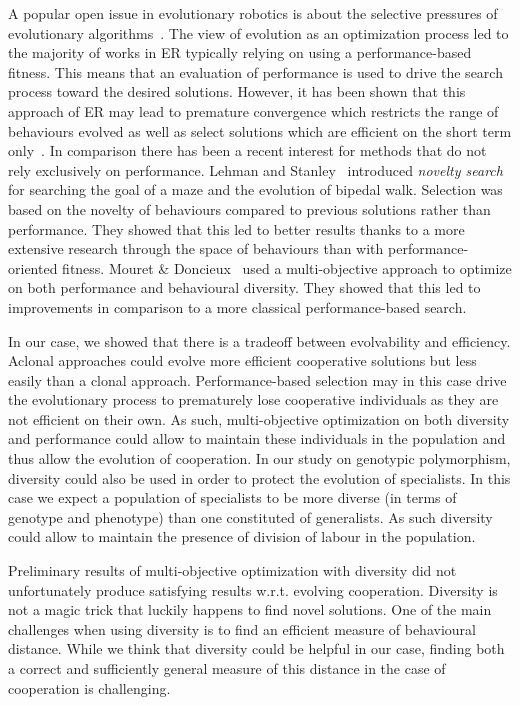 			A popular open issue in evolutionary robotics is about the selective pressures of evolutionary algorithms~\parencite{Doncieux2015a}. The view of evolution as an optimization process led to the majority of works in ER typically relying on using a performance-based fitness. This means that an evaluation of performance is used to drive the search process toward the desired solutions. However, it has been shown that this approach of ER may lead to premature convergence which restricts the range of behaviours evolved as well as select solutions which are efficient on the short term only~\parencite{Mouret2012a}. In comparison there has been a recent interest for methods that do not rely exclusively on performance. Lehman and Stanley~\parencite{Lehman2011} introduced \emph{novelty search} for searching the goal of a maze and the evolution of bipedal walk. Selection was based on the novelty of behaviours compared to previous solutions rather than performance. They showed that this led to better results thanks to a more extensive research through the space of behaviours than with performance-oriented fitness. Mouret \& Doncieux~\parencite{Mouret2012a} used a multi-objective approach to optimize on both performance and behavioural diversity. They showed that this led to improvements in comparison to a more classical performance-based search.

			In our case, we showed that there is a tradeoff between evolvability and efficiency. Aclonal approaches could evolve more efficient cooperative solutions but less easily than a clonal approach. Performance-based selection may in this case drive the evolutionary process to prematurely lose cooperative individuals as they are not efficient on their own. As such, multi-objective optimization on both diversity and performance could allow to maintain these individuals in the population and thus allow the evolution of cooperation. In our study on genotypic polymorphism, diversity could also be used in order to protect the evolution of specialists. In this case we expect a population of specialists to be more diverse (in terms of genotype and phenotype) than one constituted of generalists. As such diversity could allow to maintain the presence of division of labour in the population.

			Preliminary results of multi-objective optimization with diversity did not unfortunately produce satisfying results w.r.t. evolving cooperation. Diversity is not a magic trick that luckily happens to find novel solutions. One of the main challenges when using diversity is to find an efficient measure of behavioural distance. While we think that diversity could be helpful in our case, finding both a correct and sufficiently general measure of this distance in the case of cooperation is challenging.


